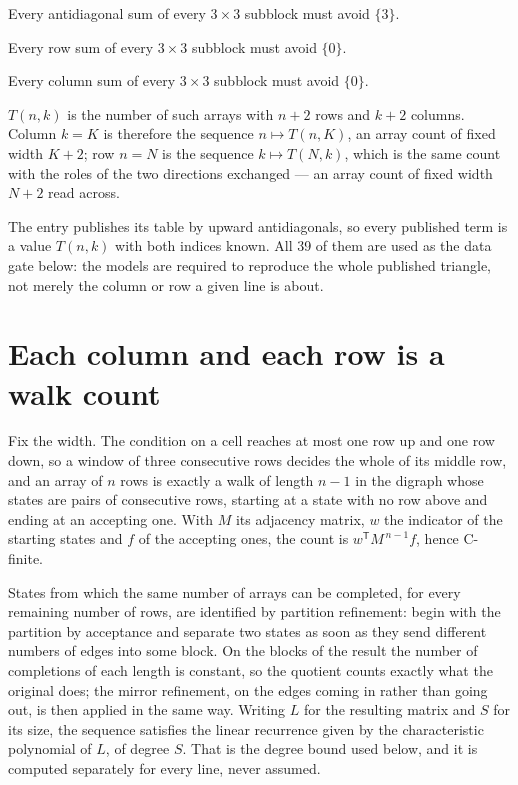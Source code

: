 \documentclass[11pt]{article}
\theoremstyle{definition}
\begin{document}
Every antidiagonal sum of every $3\times3$ subblock must avoid $\{3\}$.

Every row sum of every $3\times3$ subblock must avoid $\{0\}$.

Every column sum of every $3\times3$ subblock must avoid $\{0\}$.

$T(n,k)$ is the number of such arrays with $n + 2$ rows and $k + 2$ columns. Column $k = K$ is therefore the sequence $n \mapsto T(n,K)$, an array count of fixed width $K + 2$; row $n = N$ is the sequence $k \mapsto T(N,k)$, which is the same count with the roles of the two directions exchanged --- an array count of fixed width $N + 2$ read across.

The entry publishes its table by upward antidiagonals, so every published term is a value $T(n,k)$ with both indices known. All 39 of them are used as the data gate below: the models are required to reproduce the whole published triangle, not merely the column or row a given line is about.

\section{Each column and each row is a walk count}

Fix the width. The condition on a cell reaches at most one row up and one row down, so a window of three consecutive rows decides the whole of its middle row, and an array of $n$ rows is exactly a walk of length $n-1$ in the digraph whose states are pairs of consecutive rows, starting at a state with no row above and ending at an accepting one. With $M$ its adjacency matrix, $w$ the indicator of the starting states and $f$ of the accepting ones, the count is $w^{\mathsf T}M^{\,n-1}f$, hence C-finite.

States from which the same number of arrays can be completed, for every remaining number of rows, are identified by partition refinement: begin with the partition by acceptance and separate two states as soon as they send different numbers of edges into some block. On the blocks of the result the number of completions of each length is constant, so the quotient counts exactly what the original does; the mirror refinement, on the edges coming in rather than going out, is then applied in the same way. Writing $L$ for the resulting matrix and $S$ for its size, the sequence satisfies the linear recurrence given by the characteristic polynomial of $L$, of degree $S$. That is the degree bound used below, and it is computed separately for every line, never assumed.
\end{document}
